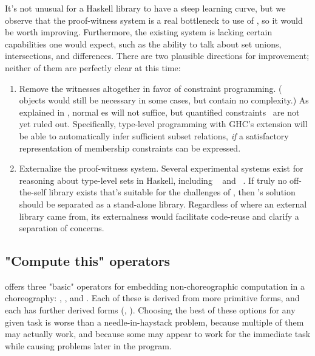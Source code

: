 It's not unusual for a Haskell library to have a steep learning curve,
but we observe that the proof-witness system is a real bottleneck to use of \MultiChor,
so it would be worth improving.
Furthermore, the existing system is lacking certain capabilities one would expect,
such as the ability to talk about set unions, intersections, and differences.
There are two plausible directions for improvement;
neither of them are perfectly clear at this time:
\begin{enumerate}
	\item Remove the witnesses altogether in favor of constraint programming.
		( objects would still be necessary in some cases, but contain no complexity.)
		As explained in , normal es will not suffice,
		but quantified constraints~\cite{bottu2017} are not yet ruled out.
		Specifically, type-level programming with GHC's  extension
		will be able to automatically infer sufficient subset relations,
		\emph{if} a satisfactory representation of membership constraints can be expressed.
	\item Externalize the proof-witness system.
		Several experimental systems exist for reasoning about type-level sets in Haskell,
		including ~\cite{gdp_hackage} and ~\cite{tls_hackage}.
		If truly no off-the-self library exists that's suitable for the challenges of \MultiChor,
		then \MultiChor's solution should be separated as a stand-alone library.
		Regardless of where an external library came from, its externalness would facilitate code-reuse 
		and clarify a separation of concerns.
\end{enumerate}

\subsection{"Compute this" operators}

\MultiChor offers three "basic" operators for embedding non-choreographic computation in a choreography:
, , and .
Each of these is derived from more primitive forms, and each has further derived forms
(\eg {}, ).
Choosing the best of these options for any given task is worse than a needle-in-haystack problem,
because multiple of them may actually work,
and because some may appear to work for the immediate task while causing problems later in the program.

